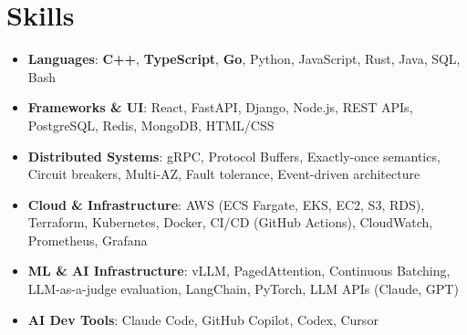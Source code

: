 \documentclass[letterpaper,11pt]{article}
\newcommand{\resumeSubHeadingListStart}{\begin{itemize}[leftmargin=0.15in, label={}]}
\newcommand{\resumeSubHeadingListEnd}{\end{itemize}}
\newcommand{\resumeSkillHeading}[2]{%
  \item\small{\textbf{#1}: #2 \vspace{-9pt}}%
}
\begin{document}
\section{Skills}
  \resumeSubHeadingListStart
    \resumeSkillHeading{Languages}{\textbf{C++}, \textbf{TypeScript}, \textbf{Go}, Python, JavaScript, Rust, Java, SQL, Bash}
    \resumeSkillHeading{Frameworks \& UI}{React, FastAPI, Django, Node.js, REST APIs, PostgreSQL, Redis, MongoDB, HTML/CSS}
    \resumeSkillHeading{Distributed Systems}{gRPC, Protocol Buffers, Exactly-once semantics, Circuit breakers, Multi-AZ, Fault tolerance, Event-driven architecture}
    \resumeSkillHeading{Cloud \& Infrastructure}{AWS (ECS Fargate, EKS, EC2, S3, RDS), Terraform, Kubernetes, Docker, CI/CD (GitHub Actions), CloudWatch, Prometheus, Grafana}
    \resumeSkillHeading{ML \& AI Infrastructure}{vLLM, PagedAttention, Continuous Batching, LLM-as-a-judge evaluation, LangChain, PyTorch, LLM APIs (Claude, GPT)}
    \resumeSkillHeading{AI Dev Tools}{Claude Code, GitHub Copilot, Codex, Cursor}
  \resumeSubHeadingListEnd
\end{document}
